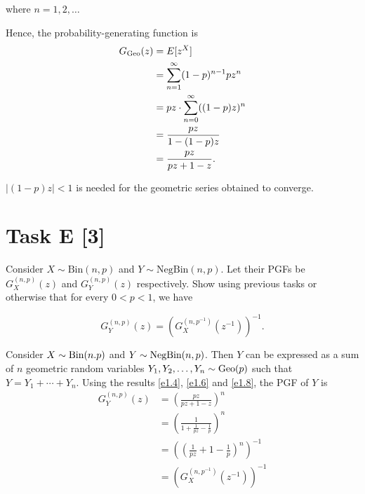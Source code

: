 where $n=1, 2, \ldots$

Hence, the probability-generating function is
\begin{equation}
    \begin{aligned}
        G_{\text{Geo}}(z) &= E[z^X] \\
        &= \sum_{n=1}^{\infty}(1-p)^{n-1}pz^n \\
        &= pz\cdot\sum_{n=0}^\infty((1-p)z)^n \\
        &= \frac{pz}{1-(1-p)z} \\
        &= \frac{pz}{pz+1-z}.
    \end{aligned}
    \label{e1.8}
\end{equation}

$|(1-p)z|<1$ is needed for the geometric series obtained to converge.


\section*{\colS{$\S$} Task E \hfill \normalfont \large [3]}

\begin{tcolorbox}
    Consider $X \sim \text{Bin}(n, p)$ and $Y \sim \text{NegBin}(n, p)$. Let their
    PGFs be $G_X^{(n, p)}(z)$ and $G_Y^{(n, p)}(z)$ respectively. Show using
    previous tasks or otherwise that for every $0 < p < 1$, we have

    \begin{equation*}
        G_Y^{(n, p)}(z) = \left( G_X^{(n, p^{-1})}(z^{-1}) \right)^{-1}.
    \end{equation*}
\end{tcolorbox}


Consider $X\sim\text{Bin}(n. p)$ and $Y\sim \text{NegBin}(n, p)$. Then $Y$ can be expressed
as a sum of $n$ geometric random variables $Y_1, Y_2, \ldots, Y_n\sim \text{Geo}(p)$
such that $Y=Y_1+\cdots+Y_n$. Using the results \ref{e1.4}, \ref{e1.6} and
\ref{e1.8}, the PGF of $Y$ is
\begin{equation}
    \begin{aligned}
        G_Y^{(n, p)}(z) &= \left(\frac{pz}{pz+1-z}\right)^n \\
        &= \left(\frac{1}{1+\frac{1}{pz}-\frac{1}{p}}\right)^n \\
        &= \left(\left(\frac{1}{pz}+1-\frac{1}{p}\right)^n\right)^{-1} \\
        &= \left(G_X^{(n, p^{-1})}(z^{-1})\right)^{-1}
    \end{aligned}
    \label{e1.9}
\end{equation}


